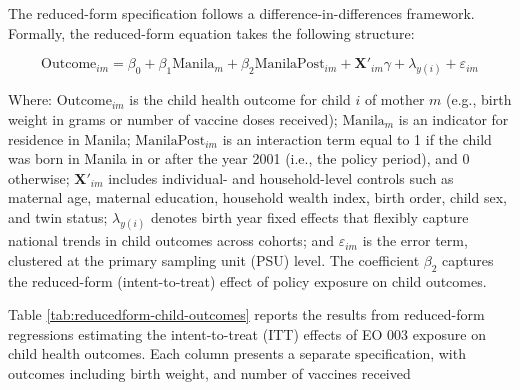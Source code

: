 \documentclass[]{AEA}
\begin{document}
The reduced-form specification follows a difference-in-differences
framework. Formally, the reduced-form equation takes the following
structure:

\[
\text{Outcome}_{im} = \beta_0 + \beta_1 \text{Manila}_m + \beta_2 \text{ManilaPost}_{im} + \boldsymbol{X}'_{im} \gamma + \lambda_{y(i)} + \varepsilon_{im}
\]

Where: \(\text{Outcome}_{im}\) is the child health outcome for child
\(i\) of mother \(m\) (e.g., birth weight in grams or number of vaccine
doses received); \(\text{Manila}_m\) is an indicator for residence in
Manila; \(\text{ManilaPost}_{im}\) is an interaction term equal to 1 if
the child was born in Manila in or after the year 2001 (i.e., the policy
period), and 0 otherwise; \(\boldsymbol{X}'_{im}\) includes individual-
and household-level controls such as maternal age, maternal education,
household wealth index, birth order, child sex, and twin status;
\(\lambda_{y(i)}\) denotes birth year fixed effects that flexibly
capture national trends in child outcomes across cohorts; and
\(\varepsilon_{im}\) is the error term, clustered at the primary
sampling unit (PSU) level. The coefficient \(\beta_2\) captures the
reduced-form (intent-to-treat) effect of policy exposure on child
outcomes.

Table \ref{tab:reducedform-child-outcomes} reports the results from
reduced-form regressions estimating the intent-to-treat (ITT) effects of
EO 003 exposure on child health outcomes. Each column presents a
separate specification, with outcomes including birth weight, and number
of vaccines received
\end{document}
